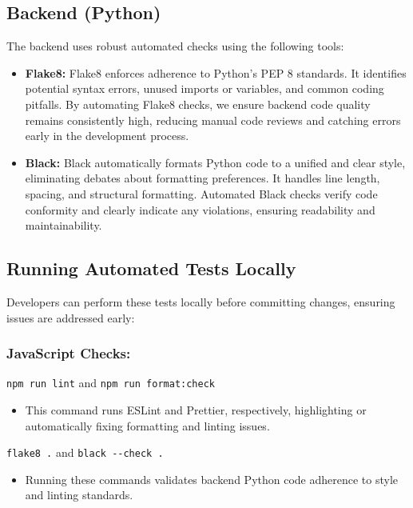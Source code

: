 \documentclass[12pt, titlepage]{article}
\begin{document}
\subsection{Backend (Python)}

The backend uses robust automated checks using the following tools:
\begin{itemize}
\item \textbf{Flake8:} Flake8 enforces adherence to Python’s PEP 8 standards. It identifies potential syntax errors, unused imports or variables, and common coding pitfalls. By automating Flake8 checks, we ensure backend code quality remains consistently high, reducing manual code reviews and catching errors early in the development process.
\item \textbf{Black:} Black automatically formats Python code to a unified and clear style, eliminating debates about formatting preferences. It handles line length, spacing, and structural formatting. Automated Black checks verify code conformity and clearly indicate any violations, ensuring readability and maintainability.
\end{itemize}

\subsection{Running Automated Tests Locally}
Developers can perform these tests locally before committing changes, ensuring issues are addressed early:

\subsubsection{JavaScript Checks:}
\verb|npm run lint| and \verb|npm run format:check|
\begin{itemize}
\item This command runs ESLint and Prettier, respectively, highlighting or automatically fixing formatting and linting issues.
\end{itemize}

\verb|flake8 .| and \verb|black --check .|
\begin{itemize}
\item Running these commands validates backend Python code adherence to style and linting standards.
\end{itemize}
\end{document}
